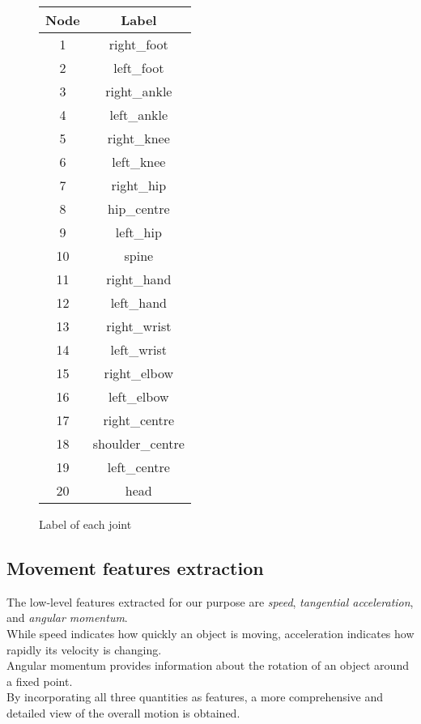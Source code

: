   \begin{figure}
    \centering
    \begin{tabular}{|c|c|}
        \hline
        \textbf{Node} & \textbf{Label} \\
        \hline
        1 & right\_foot \\
        2 & left\_foot \\
        3 & right\_ankle \\
        4 & left\_ankle \\
        5 & right\_knee \\
        6 & left\_knee \\
        7 & right\_hip \\
        8 & hip\_centre \\
        9 & left\_hip \\
        10 & spine \\
        11 & right\_hand \\
        12 & left\_hand \\
        13 & right\_wrist \\
        14 & left\_wrist \\
        15 & right\_elbow \\
        16 & left\_elbow \\
        17 & right\_centre \\
        18 & shoulder\_centre \\
        19 & left\_centre \\
        20 & head \\
        \hline
    \end{tabular}
    \caption{Label of each joint}
    \label{tab:labels_joints}
\end{figure}


\subsection{Movement features extraction}
The low-level features extracted for our purpose are \textit{speed}, \textit{tangential acceleration}, and \textit{angular momentum}. \\
While speed indicates how quickly an object is moving, acceleration indicates how rapidly its velocity is changing.\\
Angular momentum provides information about the rotation of an object around a fixed point.\\
By incorporating all three quantities as features, a more comprehensive and detailed view of the overall motion is obtained.

